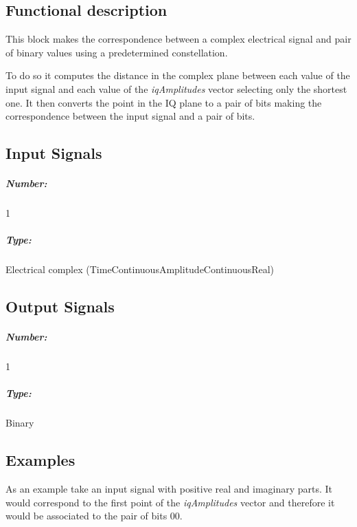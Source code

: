 \subsection*{Functional description}

This block makes the correspondence between a complex electrical signal and pair of binary values using a predetermined constellation.

To do so it computes the distance in the complex plane between each value of the input signal and each value of the \textit{iqAmplitudes} vector selecting only the shortest one. It then converts the point in the IQ plane to a pair of bits making the correspondence between the input signal and a pair of bits.

\pagebreak

\subsection*{Input Signals}

\subparagraph*{Number:} 1

\subparagraph*{Type:} Electrical complex (TimeContinuousAmplitudeContinuousReal)

\subsection*{Output Signals}

\subparagraph*{Number:} 1

\subparagraph*{Type:} Binary

\subsection*{Examples}

As an example take an input signal with positive real and imaginary parts. It would correspond to the first point of the \textit{iqAmplitudes} vector and therefore it would be associated to the  pair of bits $00$.

